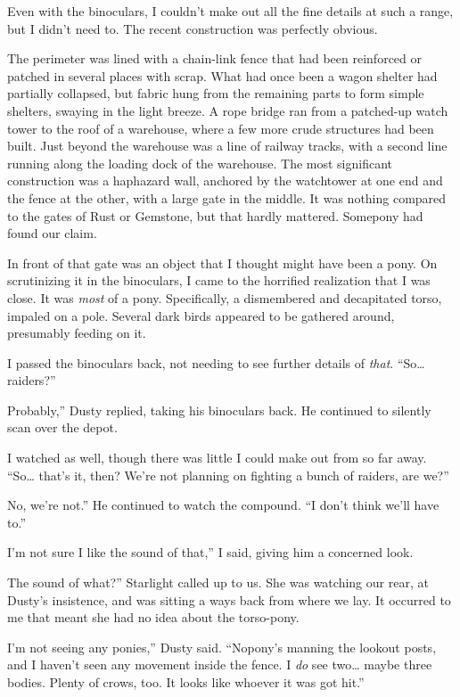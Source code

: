 Even with the binoculars, I couldn’t make out all the fine details at such a range, but I didn’t need to. The recent construction was perfectly obvious.

The perimeter was lined with a chain-link fence that had been reinforced or patched in several places with scrap. What had once been a wagon shelter had partially collapsed, but fabric hung from the remaining parts to form simple shelters, swaying in the light breeze. A rope bridge ran from a patched-up watch tower to the roof of a warehouse, where a few more crude structures had been built. Just beyond the warehouse was a line of railway tracks, with a second line running along the loading dock of the warehouse. The most significant construction was a haphazard wall, anchored by the watchtower at one end and the fence at the other, with a large gate in the middle. It was nothing compared to the gates of Rust or Gemstone, but that hardly mattered. Somepony had found our claim.

In front of that gate was an object that I thought might have been a pony. On scrutinizing it in the binoculars, I came to the horrified realization that I was close. It was \textit{most} of a pony. Specifically, a dismembered and decapitated torso, impaled on a pole. Several dark birds appeared to be gathered around, presumably feeding on it.

I passed the binoculars back, not needing to see further details of \textit{that}. “So… raiders?”

\leavevmode{}Probably,” Dusty replied, taking his binoculars back. He continued to silently scan over the depot.

I watched as well, though there was little I could make out from so far away. “So… that’s it, then? We’re not planning on fighting a bunch of raiders, are we?”

\leavevmode{}No, we’re not.” He continued to watch the compound. “I don’t think we’ll have to.”

\leavevmode{}I’m not sure I like the sound of that,” I said, giving him a concerned look.

\leavevmode{}The sound of what?” Starlight called up to us. She was watching our rear, at Dusty’s insistence, and was sitting a ways back from where we lay. It occurred to me that meant she had no idea about the torso-pony.

\leavevmode{}I’m not seeing any ponies,” Dusty said. “Nopony’s manning the lookout posts, and I haven’t seen any movement inside the fence. I \textit{do} see two… maybe three bodies. Plenty of crows, too. It looks like whoever it was got hit.”

